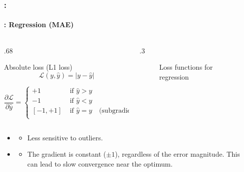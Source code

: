 \documentclass[xcolor=table]{beamer}
\begin{document}
\begin{frame}
	\frametitle{\insertshortsubtitle: \insertsection}
	\framesubtitle{\insertsubsection: Regression (MAE)}

	\begin{columns}
		\begin{column}{.68\linewidth}
			\begin{block}{Absolute loss (L1 loss)}
				\[\mathcal{L}(y, \hat{y}) = |y - \hat{y}|\]
				
				\[
				\frac{\partial \mathcal{L}}{\partial \hat{y}} = 
				\begin{cases}
				+1 & \text{ if } \hat{y} > y \\
				-1 & \text{ if } \hat{y} < y \\
				[-1, +1] & \text{ if } \hat{y} = y \quad \text{(subgradient)}\\
				\end{cases}
				\]
			\end{block}
		\end{column}%
		\begin{column}{.3\linewidth}
			\begin{figure}
				\caption{Loss functions for regression \cite{2017-rosenberg}}
			\end{figure}
		\end{column}
	\end{columns}
	
	\begin{itemize}
		\item {}
		\begin{itemize}
			\item Less sensitive to outliers.
		\end{itemize}
		\item {}
		\begin{itemize}
			\item The gradient is constant ($\pm 1$), regardless of the error magnitude.
			This can lead to slow convergence near the optimum.
		\end{itemize}
	\end{itemize}

\end{frame}
\end{document}
